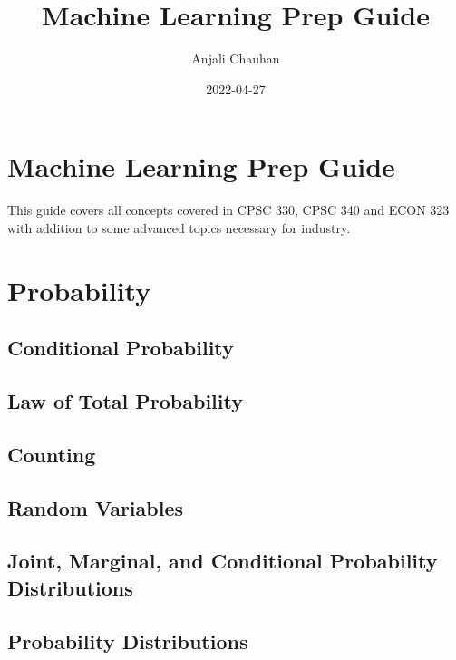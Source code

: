 \documentclass[
]{book}
\title{Machine Learning Prep Guide}
\author{Anjali Chauhan}
\date{2022-04-27}
\begin{document}
\maketitle

{
\setcounter{tocdepth}{1}
\tableofcontents
}
\hypertarget{machine-learning-prep-guide}{%
\chapter{Machine Learning Prep Guide}\label{machine-learning-prep-guide}}

This guide covers all concepts covered in CPSC 330, CPSC 340 and ECON 323 with addition to some advanced topics necessary for industry.

\hypertarget{probability}{%
\chapter{Probability}\label{probability}}

\hypertarget{conditional-probability}{%
\section{Conditional Probability}\label{conditional-probability}}

\hypertarget{law-of-total-probability}{%
\section{Law of Total Probability}\label{law-of-total-probability}}

\hypertarget{counting}{%
\section{Counting}\label{counting}}

\hypertarget{random-variables}{%
\section{Random Variables}\label{random-variables}}

\hypertarget{joint-marginal-and-conditional-probability-distributions}{%
\section{Joint, Marginal, and Conditional Probability Distributions}\label{joint-marginal-and-conditional-probability-distributions}}

\hypertarget{probability-distributions}{%
\section{Probability Distributions}\label{probability-distributions}}
\end{document}
